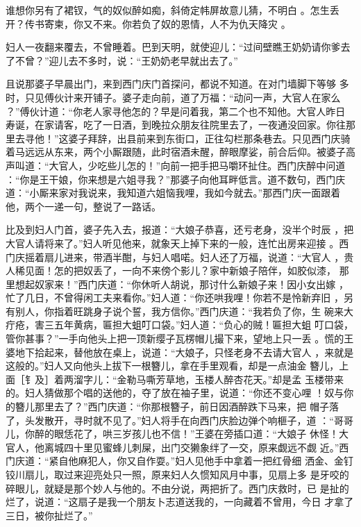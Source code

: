 谁想你另有了裙钗，气的奴似醉如痴，斜倚定帏屏故意儿猜，不明白
。怎生丢开？传书寄柬，你又不来。你若负了奴的恩情，人不为仇天降灾
。

妇人一夜翻来覆去，不曾睡着。巴到天明，就使迎儿：“过间壁瞧王奶奶请你爹去
了不曾？”迎儿去不多时，说：“王奶奶老早就出去了。”

且说那婆子早晨出门，来到西门庆门首探问，都说不知道。在对门墙脚下等够
多时，只见傅伙计来开铺子。婆子走向前，道了万福：“动问一声，大官人在家么
？”傅伙计道：“你老人家寻他怎的？早是问着我，第二个也不知他。大官人昨日
寿诞，在家请客，吃了一日酒，到晚拉众朋友往院里去了，一夜通没回家。你往那
里去寻他！”这婆子拜辞，出县前来到东街口，正往勾栏那条巷去。只见西门庆骑
着马远远从东来，两个小厮跟随，此时宿酒未醒，醉眼摩娑，前合后仰。被婆子高
声叫道：“大官人，少吃些儿怎的！”向前一把手把马嚼环扯住。西门庆醉中问道
：“你是王干娘，你来想是六姐寻我？”那婆子向他耳畔低言。道不数句，西门庆
道：“小厮来家对我说来，我知道六姐恼我哩，我如今就去。”那西门庆一面跟着
他，两个一递一句，整说了一路话。

比及到妇人门首，婆子先入去，报道：“大娘子恭喜，还亏老身，没半个时辰
，把大官人请将来了。”妇人听见他来，就象天上掉下来的一般，连忙出房来迎接
。西门庆摇着扇儿进来，带酒半酣，与妇人唱喏。妇人还了万福，说道：“大官人
，贵人稀见面！怎的把奴丢了，一向不来傍个影儿？家中新娘子陪伴，如胶似漆，
那里想起奴家来！”西门庆道：“你休听人胡说，那讨什么新娘子来！因小女出嫁
，忙了几日，不曾得闲工夫来看你。”妇人道：“你还哄我哩！你若不是怜新弃旧
，另有别人，你指着旺跳身子说个誓，我方信你。”西门庆道：“我若负了你，生
碗来大疔疮，害三五年黄病，匾担大蛆叮口袋。”妇人道：“负心的贼！匾担大蛆
叮口袋，管你甚事？”一手向他头上把一顶新缨子瓦楞帽儿撮下来，望地上只一丢
。慌的王婆地下拾起来，替他放在桌上，说道：“大娘子，只怪老身不去请大官人
，来就是这般的。”妇人又向他头上拔下一根簪儿，拿在手里观看，却是一点油金
簪儿，上面［钅及］着两溜字儿：“金勒马嘶芳草地，玉楼人醉杏花天。”却是孟
玉楼带来的。妇人猜做那个唱的送他的，夺了放在袖子里，说道：“你还不变心哩
！奴与你的簪儿那里去了？”西门庆道：“你那根簪子，前日因酒醉跌下马来，把
帽子落了，头发散开，寻时就不见了。”妇人将手在向西门庆脸边弹个响榧子，道
：“哥哥儿，你醉的眼恁花了，哄三岁孩儿也不信！”王婆在旁插口道：“大娘子
休怪！大官人，他离城四十里见蜜蜂儿刺屎，出门交獭象绊了一交，原来觑远不觑
近。”西门庆道：“紧自他麻犯人，你又自作耍。”妇人见他手中拿着一把红骨细
洒金、金钉铰川扇儿，取过来迎亮处只一照，原来妇人久惯知风月中事，见扇上多
是牙咬的碎眼儿，就疑是那个妙人与他的。不由分说，两把折了。西门庆救时，已
是扯的烂了，说道：“这扇子是我一个朋友卜志道送我的，一向藏着不曾用，今日
才拿了三日，被你扯烂了。”

